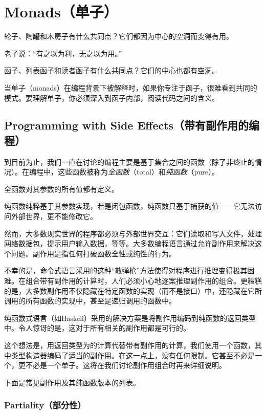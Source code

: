 \documentclass[DaoFP]{subfiles}
\begin{document}
    \setcounter{chapter}{13}

    \chapter{Monads（单子）}

    轮子、陶罐和木房子有什么共同点？它们都因为中心的空洞而变得有用。

    老子说：“有之以为利，无之以为用。”

    函子、列表函子和读者函子有什么共同点？它们的中心也都有空洞。

    当单子（monads）在编程背景下被解释时，如果你专注于函子，很难看到共同的模式。要理解单子，你必须深入到函子内部，阅读代码之间的含义。

    \section{Programming with Side Effects（带有副作用的编程）}

    到目前为止，我们一直在讨论的编程主要是基于集合之间的函数（除了非终止的情况）。在编程中，这些函数被称为\emph{全函数}（total）和\emph{纯函数}（pure）。

    全函数对其参数的所有值都有定义。

    纯函数纯粹基于其参数实现，若是闭包函数，纯函数只基于捕获的值——它无法访问外部世界，更不能修改它。

    然而，大多数现实世界的程序都必须与外部世界交互：它们读取和写入文件，处理网络数据包，提示用户输入数据，等等。大多数编程语言通过允许副作用来解决这个问题。副作用是指任何打破函数全性或纯性的行为。

    不幸的是，命令式语言采用的这种“散弹枪”方法使得对程序进行推理变得极其困难。在组合带有副作用的计算时，人们必须小心地逐案推理副作用的组合。更糟糕的是，大多数副作用不仅隐藏在特定函数的实现（而不是接口）中，还隐藏在它所调用的所有函数的实现中，甚至是递归调用的函数中。

    纯函数式语言（如Haskell）采用的解决方案是将副作用编码到纯函数的返回类型中。令人惊讶的是，这对于所有相关的副作用都是可行的。

    这个想法是，用返回类型为的计算代替带有副作用的计算，我们使用一个函数，其中类型构造器编码了适当的副作用。在这一点上，没有任何限制。它甚至不必是一个，更不必是一个单子。这将在我们讨论副作用组合时再来详细说明。

    下面是常见副作用及其纯函数版本的列表。

    \subsection{Partiality（部分性）}
\end{document}
